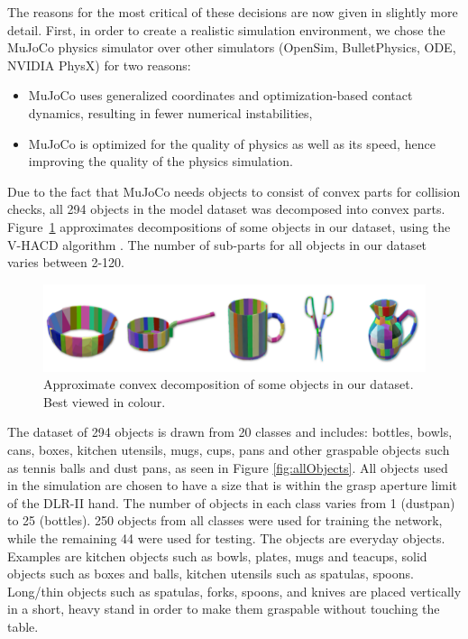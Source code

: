 The reasons for the most critical of these decisions are now given in slightly more detail. First, in order to create a realistic simulation environment, we chose the MuJoCo \cite{MuJoCo} physics simulator over other simulators (OpenSim, BulletPhysics, ODE, NVIDIA PhysX) for two reasons: 
\begin{itemize}
\item MuJoCo uses generalized coordinates and optimization-based contact dynamics, resulting in fewer numerical instabilities,
\item MuJoCo is optimized for the quality of physics as well as its speed, hence improving the quality of the physics simulation.
\end{itemize}

Due to the fact that MuJoCo needs objects to consist of convex parts for collision checks, all 294 objects in the model dataset was decomposed into convex parts. Figure~\ref{fig:objectDecomposition} approximates decompositions of some objects in our dataset, using the V-HACD algorithm \cite{V-HACD}. The number of sub-parts for all objects in our dataset varies between 2-120. 
\begin{figure}
  \includegraphics[width=\linewidth]{images/decomposition.png}
  \caption{Approximate convex decomposition of some objects in our dataset. Best viewed in colour.}
  \label{fig:objectDecomposition}
\end{figure}
The dataset of 294 objects is drawn from 20 classes and includes: bottles, bowls, cans, boxes, kitchen utensils, mugs, cups, pans and other graspable objects such as tennis balls and dust pans, as seen in Figure \ref{fig:allObjects}. All objects used in the simulation are chosen to have a size that is within the grasp aperture limit of the DLR-II hand. The number of objects in each class varies from 1 (dustpan) to 25 (bottles). 250 objects from all classes were used for training the network, while the remaining 44 were used for testing. The objects are everyday objects. Examples are kitchen objects such as bowls, plates, mugs and teacups, solid objects such as boxes and balls, kitchen utensils such as spatulas, spoons. Long/thin objects such as spatulas, forks, spoons, and knives are placed vertically in a short, heavy stand in order to make them graspable without touching the table. 

